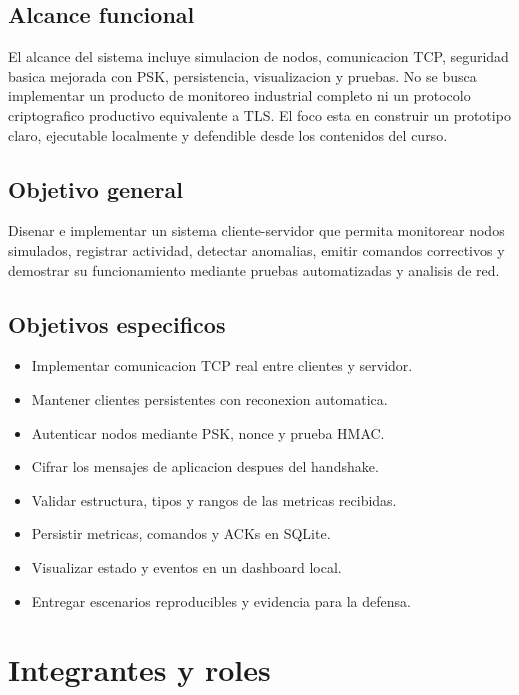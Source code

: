 \documentclass[11pt,letterpaper]{article}
\begin{document}
\subsection{Alcance funcional}

El alcance del sistema incluye simulacion de nodos, comunicacion TCP, seguridad
basica mejorada con PSK, persistencia, visualizacion y pruebas. No se busca
implementar un producto de monitoreo industrial completo ni un protocolo
criptografico productivo equivalente a TLS. El foco esta en construir un
prototipo claro, ejecutable localmente y defendible desde los contenidos del
curso.

\subsection{Objetivo general}

Disenar e implementar un sistema cliente-servidor que permita monitorear nodos
simulados, registrar actividad, detectar anomalias, emitir comandos correctivos
y demostrar su funcionamiento mediante pruebas automatizadas y analisis de red.

\subsection{Objetivos especificos}

\begin{itemize}
  \item Implementar comunicacion TCP real entre clientes y servidor.
  \item Mantener clientes persistentes con reconexion automatica.
  \item Autenticar nodos mediante PSK, nonce y prueba HMAC.
  \item Cifrar los mensajes de aplicacion despues del handshake.
  \item Validar estructura, tipos y rangos de las metricas recibidas.
  \item Persistir metricas, comandos y ACKs en SQLite.
  \item Visualizar estado y eventos en un dashboard local.
  \item Entregar escenarios reproducibles y evidencia para la defensa.
\end{itemize}

\newpage
\section{Integrantes y roles}
\end{document}
